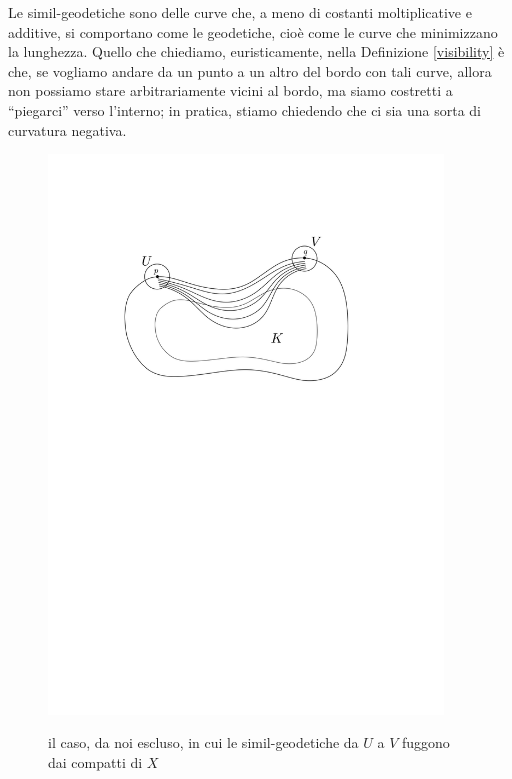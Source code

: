 Le simil-geodetiche sono delle curve che, a meno di costanti moltiplicative e additive, si comportano come le geodetiche, cioè come le curve che minimizzano la lunghezza.
Quello che chiediamo, euristicamente, nella Definizione \ref{visibility} è che, se vogliamo andare da un punto a un altro del bordo con tali curve, allora non possiamo stare arbitrariamente vicini al bordo, ma siamo costretti a ``piegarci'' verso l'interno; in pratica, stiamo chiedendo che ci sia una sorta di curvatura negativa.

\begin{figure}[h!]
    \begin{center}
        \includegraphics[width=0.935\textwidth, trim=0 18cm 0 5cm]{Immagini/nonvis.png} \\
        \caption{il caso, da noi escluso, in cui le simil-geodetiche da $U$ a $V$ fuggono dai compatti di $X$}
    \end{center}
\end{figure}

